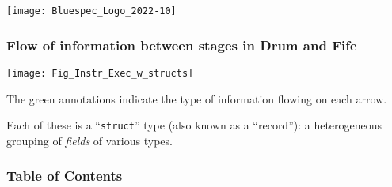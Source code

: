 



\date{L6: RISC-V: Core functions for ISA execution}





\begin{frame}
 \titlepage

 \begin{center}
  \texttt{[image: Bluespec\_Logo\_2022-10]}
 \end{center}

\end{frame}





\begin{frame}
\frametitle{Flow of information between stages in Drum and Fife}

\footnotesize

\begin{center}
\texttt{[image: Fig\_Instr\_Exec\_w\_structs]}
\end{center}

\vspace*{2ex}

The green annotations indicate the type of information flowing on each arrow.

Each of these is a ``{\tt struct}'' type (also known as a ``record''):
a heterogeneous grouping of \emph{fields} of various types.

\end{frame}


\begin{frame}
\frametitle{Table of Contents}

\tableofcontents

\end{frame}

